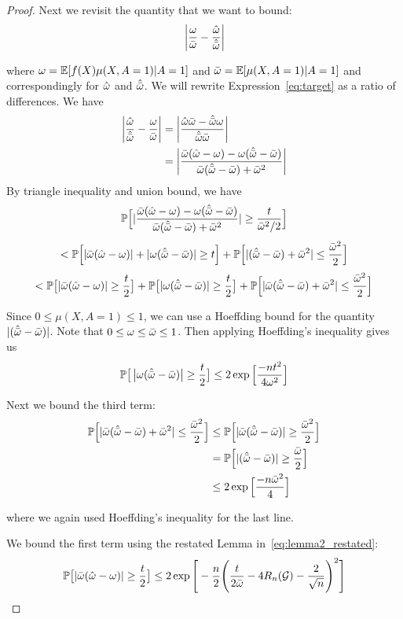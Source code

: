 \documentclass{article}
\begin{document}
\begin{proof}
Next we revisit the quantity that we want to bound:
\begin{equation} \label{eq:target}
    \left| \frac{\omega}{\bar{\omega}} - \frac{\hat{\omega}}{\hat{\bar{\omega}}} \right|
\end{equation}

where $\omega = \mathbb{E}[f(X) \mu(X, A = 1) | A = 1]$ and $\bar{\omega} = \mathbb{E}[ \mu(X, A = 1) | A = 1]$ and correspondingly for $\hat{\omega}$ and $\hat{\bar{\omega}}$.
We will rewrite Expression~\ref{eq:target} as a ratio of differences.
We have 
\begin{eqnarray}
   \left| \frac{\hat{\omega}}{\hat{\bar{\omega}}} - \frac{\omega}{\bar{\omega}} \right| &= \left| \frac{\hat{\omega} \bar{\omega} - \hat{\bar{\omega}} \omega}{\hat{\bar{\omega}} \bar{\omega}} \right| \\ 
   &= \left| \frac{\bar{\omega}(\hat{\omega} - \omega)  - \omega(\hat{\bar{\omega}} - \bar{\omega})}{\bar{\omega}(\hat{\bar{\omega}} -\bar{\omega}) + \bar{\omega}^2} \right| \\ 
\end{eqnarray}
By triangle inequality and union bound, we have 
\[
\mathbb{P}\Big[|\frac{\bar{\omega}(\hat{\omega} - \omega)  - \omega(\hat{\bar{\omega}} - \bar{\omega})}{\bar{\omega}(\hat{\bar{\omega}} - \bar{\omega}) + \bar{\omega}^2} | \geq \frac{t}{\bar{\omega}^2/2} \Big] 
\]
\[
< \mathbb{P}\Big[|\bar{\omega}(\hat{\omega} - \omega)|  + |\omega(\hat{\bar{\omega}} - \bar{\omega})| \geq t\Big] + \mathbb{P}\Big[|(\hat{\bar{\omega}} - \bar{\omega}) + \bar{\omega}^2| \leq \frac{\bar{\omega}^2}{2} \Big]
\]
\[
<  \mathbb{P}\big[|\bar{\omega}(\hat{\omega} - \omega)| \geq \frac{t}{2}\big]  + \mathbb{P}\big[|\omega(\hat{\bar{\omega}} - \bar{\omega})| \geq \frac{t}{2}\big] + \mathbb{P}\Big[|\bar{\omega}(\hat{\bar{\omega}} -\bar{\omega}) + \bar{\omega}^2| \leq \frac{\bar{\omega}^2}{2} \Big] 
\]

Since $0 \leq \mu(X, A = 1) \leq 1$, we can use a Hoeffding bound for the quantity $|(\hat{\bar{\omega}} -\bar{\omega})|$.
Note that $0 \leq  \omega \leq \bar{\omega} \leq 1$.
Then applying Hoeffding's inequality gives us
\begin{eqnarray}
   \mathbb{P}\big[\left| \omega(\hat{\bar{\omega}} - \bar{\omega}) \right| \geq \frac{t}{2}\big] \leq 2 \exp \Big[\frac{-n t^2}{4\omega^2} \Big]
\end{eqnarray}

Next we bound the third term: 
\begin{eqnarray}
   \mathbb{P}\Big[|\bar{\omega}(\hat{\bar{\omega}} -\bar{\omega}) + \bar{\omega}^2| \leq \frac{\bar{\omega}^2}{2} \Big] &\leq 
   \mathbb{P}\Big[|\bar{\omega}(\hat{\bar{\omega}} -\bar{\omega})| \geq \frac{\bar{\omega}^2}{2} \Big] \\
   &=   \mathbb{P}\Big[|(\hat{\bar{\omega}} -\bar{\omega})| \geq \frac{\bar{\omega}}{2} \Big] \\
   & \leq 2 \exp\Big[\frac{-n\bar{\omega}^2}{4} \Big]
\end{eqnarray}

where we again used Hoeffding's inequality for the last line.

We bound the first term using the restated Lemma in~\ref{eq:lemma2_restated}:
\begin{equation}
     \mathbb{P}\big[|\bar{\omega}(\hat{\omega} - \omega)| \geq \frac{t}{2}\big] \leq 2\exp\Bigg[-\frac{n}{2}\Bigg(\frac{t}{2\bar{\omega}}  - 4 R_n(\mathcal{G}) - \frac{2}{\sqrt{n}}\Bigg)^2 \Bigg]
\end{equation}


\end{proof}
\end{document}
